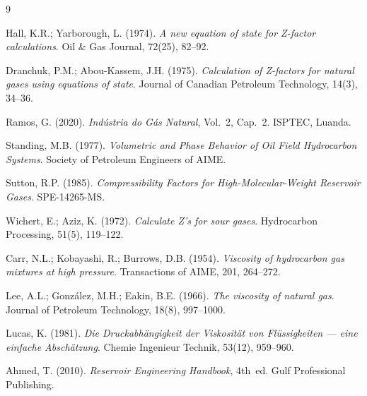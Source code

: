 \documentclass[12pt,a4paper]{article}
\begin{document}
\begin{thebibliography}{9}

  Hall, K.R.; Yarborough, L. (1974).
  \textit{A new equation of state for Z-factor calculations}.
  Oil \& Gas Journal, 72(25), 82--92.

  Dranchuk, P.M.; Abou-Kassem, J.H. (1975).
  \textit{Calculation of Z-factors for natural gases using equations of state}.
  Journal of Canadian Petroleum Technology, 14(3), 34--36.

  Ramos, G. (2020).
  \textit{Indústria do Gás Natural}, Vol.~2, Cap.~2.
  ISPTEC, Luanda.

  Standing, M.B. (1977).
  \textit{Volumetric and Phase Behavior of Oil Field Hydrocarbon Systems}.
  Society of Petroleum Engineers of AIME.

  Sutton, R.P. (1985).
  \textit{Compressibility Factors for High-Molecular-Weight Reservoir Gases}.
  SPE-14265-MS.

  Wichert, E.; Aziz, K. (1972).
  \textit{Calculate Z's for sour gases}.
  Hydrocarbon Processing, 51(5), 119--122.

  Carr, N.L.; Kobayashi, R.; Burrows, D.B. (1954).
  \textit{Viscosity of hydrocarbon gas mixtures at high pressure}.
  Transactions of AIME, 201, 264--272.

  Lee, A.L.; González, M.H.; Eakin, B.E. (1966).
  \textit{The viscosity of natural gas}.
  Journal of Petroleum Technology, 18(8), 997--1000.

  Lucas, K. (1981).
  \textit{Die Druckabhängigkeit der Viskosität von Flüssigkeiten — eine einfache Abschätzung}.
  Chemie Ingenieur Technik, 53(12), 959--960.

  Ahmed, T. (2010).
  \textit{Reservoir Engineering Handbook}, 4th~ed.
  Gulf Professional Publishing.

\end{thebibliography}
\end{document}

